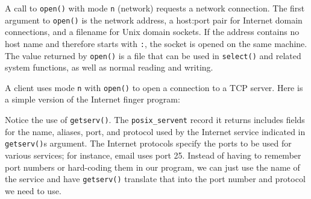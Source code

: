 A call to \texttt{open()} with mode
\texttt{{\textquotedbl}n{\textquotedbl}} (network) requests a network
connection. The first argument to \texttt{open()} is the network
address, a host:port pair for Internet domain connections, and a
filename for Unix domain sockets. If the address contains no host name
and therefore starts with \texttt{{\textquotedbl}:{\textquotedbl}}, the
socket is opened on the same machine. The value returned by
\texttt{open()} is a file that can be used in \texttt{select()} and
related system functions, as well as normal reading and writing. 

A client uses mode
\texttt{{\textquotedbl}n{\textquotedbl}} with \texttt{open()} to open a
connection to a TCP server. Here is a simple version of the Internet
{\textquotedbl}finger{\textquotedbl} program:


Notice the use of \texttt{getserv()}. The
\texttt{posix\_servent} record it returns includes fields for the name,
aliases, port, and protocol used by the Internet service indicated in
\texttt{getserv()}{\textquotesingle}s argument. The Internet protocols
specify the ports to be used for various services; for instance, email
uses port 25. Instead of having to remember port numbers or hard-coding
them in our program, we can just use the name of the service and have
\texttt{getserv()} translate that into the port number and protocol we
need to use.

